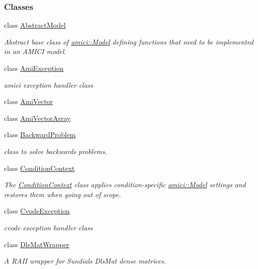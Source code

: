 \subsubsection*{Classes}
\begin{DoxyCompactItemize}
\item 
class \mbox{\hyperlink{classamici_1_1_abstract_model}{Abstract\+Model}}
\begin{DoxyCompactList}\small\item\em Abstract base class of \mbox{\hyperlink{classamici_1_1_model}{amici\+::\+Model}} defining functions that need to be implemented in an A\+M\+I\+CI model. \end{DoxyCompactList}\item 
class \mbox{\hyperlink{classamici_1_1_ami_exception}{Ami\+Exception}}
\begin{DoxyCompactList}\small\item\em amici exception handler class \end{DoxyCompactList}\item 
class \mbox{\hyperlink{classamici_1_1_ami_vector}{Ami\+Vector}}
\item 
class \mbox{\hyperlink{classamici_1_1_ami_vector_array}{Ami\+Vector\+Array}}
\item 
class \mbox{\hyperlink{classamici_1_1_backward_problem}{Backward\+Problem}}
\begin{DoxyCompactList}\small\item\em class to solve backwards problems. \end{DoxyCompactList}\item 
class \mbox{\hyperlink{classamici_1_1_condition_context}{Condition\+Context}}
\begin{DoxyCompactList}\small\item\em The \mbox{\hyperlink{classamici_1_1_condition_context}{Condition\+Context}} class applies condition-\/specific \mbox{\hyperlink{classamici_1_1_model}{amici\+::\+Model}} settings and restores them when going out of scope. \end{DoxyCompactList}\item 
class \mbox{\hyperlink{classamici_1_1_cvode_exception}{Cvode\+Exception}}
\begin{DoxyCompactList}\small\item\em cvode exception handler class \end{DoxyCompactList}\item 
class \mbox{\hyperlink{classamici_1_1_dls_mat_wrapper}{Dls\+Mat\+Wrapper}}
\begin{DoxyCompactList}\small\item\em A R\+A\+II wrapper for Sundials Dls\+Mat dense matrices. \end{DoxyCompactList}\item 

\end{DoxyCompactItemize}
